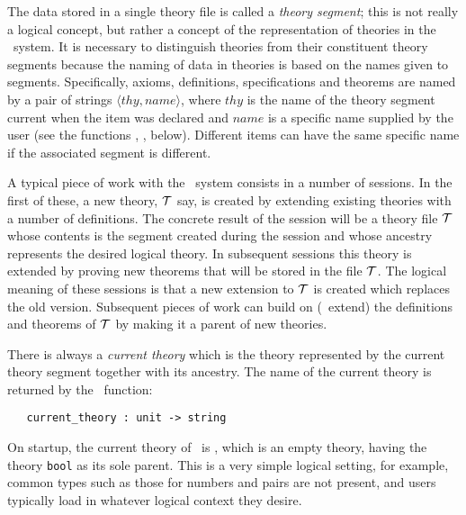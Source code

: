 The data stored in a single theory file is called a {\it theory segment\/};
this is not really a logical concept, but rather a concept of the
representation of theories in the \HOL\ system. It is necessary to distinguish
theories from their constituent theory segments  because the naming of data
in theories is based on the names given to segments.  Specifically, axioms,
definitions, specifications and theorems are named
 by a pair of strings
$\langle thy,name \rangle$,
where $thy$ is the name of the theory segment current when the
item was declared and $name$ is a specific name supplied by the user (see the
functions , , below). Different items
can have the same specific name if the associated segment is different.

A typical piece of work with the \HOL\ system consists in a number of
sessions.
In the first of these, a new theory, ${\cal T}$ say, is created by
extending existing theories with a number of definitions. The concrete result
of the session will be a theory file ${\cal T}$ whose contents is the
segment created during the session and whose ancestry represents the desired
logical theory.  In subsequent sessions this theory is extended by proving new
theorems that will be stored in the file ${\cal T}$. The logical
meaning of these sessions is that a new extension to ${\cal T}$ is created
which replaces the old version.  Subsequent pieces of work can build on (\ie\
extend) the definitions and theorems of ${\cal T}$ by making it a parent of
new theories.

There is always a {\it current theory\/} which is the theory represented by
the current theory segment together with its ancestry. The name of the current
theory is returned by the \ML\ function:

\begin{boxed}
\begin{verbatim}
   current_theory : unit -> string
\end{verbatim}\end{boxed}

On startup, the current theory of \HOL\ is , which is an
empty theory, having the theory {\small\verb+bool+} as its sole
parent. This is a very simple logical setting, for example, common types
such as those for numbers and pairs are not present, and users typically load
in whatever logical context they desire.

